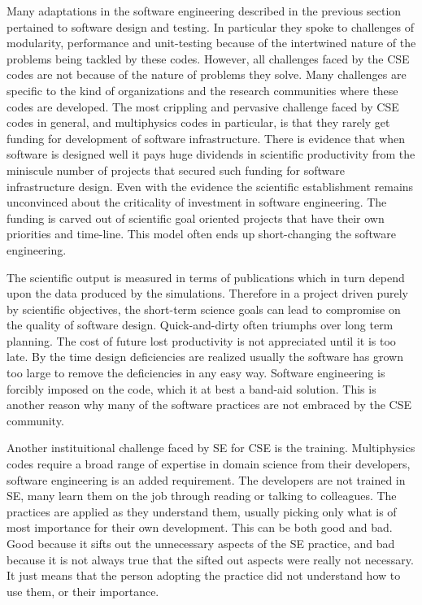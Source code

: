 
\label{sec:instChallenges}
Many adaptations in the software engineering described in the previous
section pertained to software design and testing. In particular they
spoke to challenges of modularity, performance and unit-testing because of the
intertwined nature of the problems being tackled by these
codes. However, all challenges faced by the CSE codes are not
because of the nature of problems they solve. Many challenges are
specific to the kind of organizations and the research communities
where these codes are developed. The most crippling and pervasive
challenge faced by CSE codes in general, and multiphysics codes in
particular, is that they rarely get funding for development of software
infrastructure. There is evidence that when software is designed well
it pays huge dividends in scientific productivity from the
miniscule number of projects that secured such funding for software
infrastructure design. Even with the evidence the scientific
establishment remains unconvinced about the criticality of investment
in software engineering. The funding is carved out of scientific goal
oriented projects that have their own priorities and time-line. This
model often ends up short-changing the software engineering.


The scientific output is measured in terms of publications which in
turn depend upon the data produced by the simulations. Therefore in a
project driven purely by scientific objectives, the short-term science
goals can lead to compromise on the quality of software
design. Quick-and-dirty often triumphs over long term planning. The
cost of future lost productivity is not appreciated until it is too
late. By the time design deficiencies are realized usually the
software has grown too large to remove the deficiencies in any easy
way.  Software engineering is forcibly imposed on the code, which it
at best a band-aid solution. This is another reason why many of the
software practices are not embraced by the CSE community. 

Another instituitional challenge faced by SE for CSE is the
training. Multiphysics codes require a broad range of expertise in
domain science from their developers, software engineering is an added
requirement. The developers are not trained in SE, many learn them on
the job through reading or talking to colleagues. The practices are
applied as they understand them, usually picking only what is of most
importance for their own development. This can be both good and
bad. Good because it sifts out the unnecessary aspects of the SE
practice, and bad because it is not always true that the sifted out
aspects were really not necessary. It just means that the person
adopting the practice did not understand how to use them, or their
importance. 

